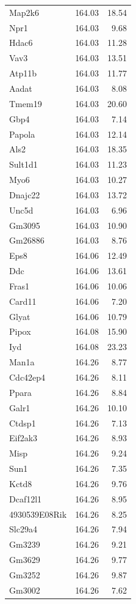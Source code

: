 \documentclass[oneside]{book}\usepackage[]{graphicx}\usepackage[]{color}
\begin{document}
\begin{appendices}
{\begin{longtable}{lrr}
  Map2k6 & 164.03 & 18.54 \\
  Npr1 & 164.03 & 9.68 \\
  Hdac6 & 164.03 & 11.28 \\
  Vav3 & 164.03 & 13.51 \\
  Atp11b & 164.03 & 11.77 \\
  Aadat & 164.03 & 8.08 \\
  Tmem19 & 164.03 & 20.60 \\
  Gbp4 & 164.03 & 7.14 \\
  Papola & 164.03 & 12.14 \\
  Als2 & 164.03 & 18.35 \\
  Sult1d1 & 164.03 & 11.23 \\
  Myo6 & 164.03 & 10.27 \\
  Dnajc22 & 164.03 & 13.72 \\
  Unc5d & 164.03 & 6.96 \\
  Gm3095 & 164.03 & 10.90 \\
  Gm26886 & 164.03 & 8.76 \\
  Eps8 & 164.06 & 12.49 \\
  Ddc & 164.06 & 13.61 \\
  Fras1 & 164.06 & 10.06 \\
  Card11 & 164.06 & 7.20 \\
  Glyat & 164.06 & 10.79 \\
  Pipox & 164.08 & 15.90 \\
  Iyd & 164.08 & 23.23 \\
  Man1a & 164.26 & 8.77 \\
  Cdc42ep4 & 164.26 & 8.11 \\
  Ppara & 164.26 & 8.84 \\
  Galr1 & 164.26 & 10.10 \\
  Ctdsp1 & 164.26 & 7.13 \\
  Eif2ak3 & 164.26 & 8.93 \\
  Misp & 164.26 & 9.24 \\
  Sun1 & 164.26 & 7.35 \\
  Kctd8 & 164.26 & 9.76 \\
  Dcaf12l1 & 164.26 & 8.95 \\
  4930539E08Rik & 164.26 & 8.25 \\
  Slc29a4 & 164.26 & 7.94 \\
  Gm3239 & 164.26 & 9.21 \\
  Gm3629 & 164.26 & 9.77 \\
  Gm3252 & 164.26 & 9.87 \\
  Gm3002 & 164.26 & 7.62 \\

\end{longtable}}
\end{appendices}
\end{document}
